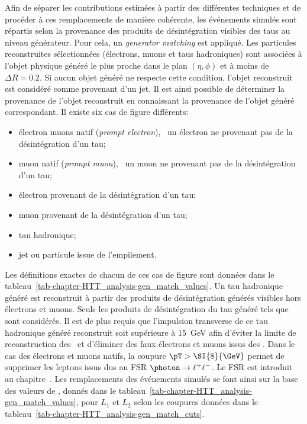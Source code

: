 Afin de séparer les contributions estimées à partir des différentes techniques et de procéder à ces remplacements de manière cohérente, les événements simulés sont répartis selon la provenance des produits de désintégration visibles des taus au niveau générateur.
Pour cela, un \emph{generator matching} est appliqué.
Les particules reconstruites sélectionnées (électrons, muons et taus hadroniques) sont associées à l'objet physique généré le plus proche dans le plan $(\eta, \phi)$ et à moins de $\Delta R = \num{0.2}$.
Si aucun objet généré ne respecte cette condition, l'objet reconstruit est considéré comme provenant d'un jet.
Il est ainsi possible de déterminer la provenance de l'objet reconstruit en connaissant la provenance de l'objet généré correspondant.
Il existe six cas de figure différents:
\begin{itemize}
\item électron muons natif (\emph{prompt electron}), \ie\ un électron ne provenant pas de la désintégration d'un tau;
\item muon natif (\emph{prompt muon}), \ie\ un muon ne provenant pas de la désintégration d'un tau;
\item électron provenant de la désintégration d'un tau;
\item muon provenant de la désintégration d'un tau;
\item tau hadronique;
\item jet ou particule issue de l'empilement.
\end{itemize}
Les définitions exactes de chacun de ces cas de figure sont données dans le tableau~\ref{tab-chapter-HTT_analysis-gen_match_values}.
Un tau hadronique généré est reconstruit à partir des produits de désintégration générés visibles hors électrons et muons.
Seuls les produits de désintégration du tau généré tels que  sont considérés.
Il est de plus requis que l'impulsion transverse de ce tau hadronique généré reconstruit soit supérieure à \SI{15}{\GeV} afin d'éviter la limite de reconstruction des \tauh\ et d'éliminer des faux électrons et muons issus des \tauh.
Dans le cas des électrons et muons natifs, la coupure $\pT > \SI{8}{\GeV}$ permet de supprimer les leptons issus dus au FSR $\photon\to\ell^+\ell^-$.
Le FSR est introduit au chapitre~.
Les remplacements des événements simulés se font ainsi sur la base des valeurs de , donnés dans le tableau~\ref{tab-chapter-HTT_analysis-gen_match_values}, pour $L_1$ et $L_2$ selon les coupures données dans le tableau~\ref{tab-chapter-HTT_analysis-gen_match_cuts}.
